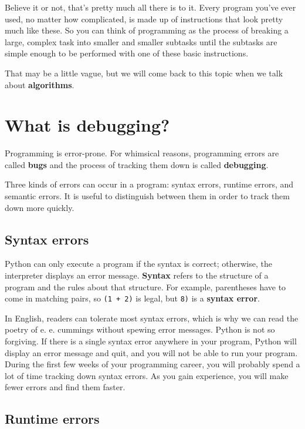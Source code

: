 \documentclass[10pt]{book}
\begin{document}
Believe it or not, that's pretty much all there is to it.  Every
program you've ever used, no matter how complicated, is made up of
instructions that look pretty much like these.  So you can think of
programming as the process of breaking a large, complex task
into smaller and smaller subtasks until the subtasks are
simple enough to be performed with one of these basic instructions.

That may be a little vague, but we will come back to this topic
when we talk about {\bf algorithms}.

\section{What is debugging?}

Programming is error-prone.  For whimsical reasons, programming errors
are called {\bf bugs} and the process of tracking them down is called
{\bf debugging}.

Three kinds of errors can occur in a program: syntax errors, runtime 
errors, and semantic errors. It is useful
to distinguish between them in order to track them down more quickly.

\subsection{Syntax errors}

Python can only execute a program if the syntax is
correct; otherwise, the interpreter displays an error message.
{\bf Syntax} refers to the structure of a program and the rules about
that structure.
For example, parentheses have to come in matching pairs, so
{\tt (1 + 2)} is legal, but {\tt 8)} is a {\bf syntax error}.

In English, readers can tolerate most syntax errors, which is why we
can read the poetry of e. e. cummings without spewing error messages.
Python is not so forgiving.  If there is a single syntax error
anywhere in your program, Python will display an error message and quit,
and you will not be able to run your program. During the first few
weeks of your programming career, you will probably spend a lot of
time tracking down syntax errors.  As you gain experience, you will
make fewer errors and find them faster.

\subsection{Runtime errors}
\label{runtime}
\end{document}
